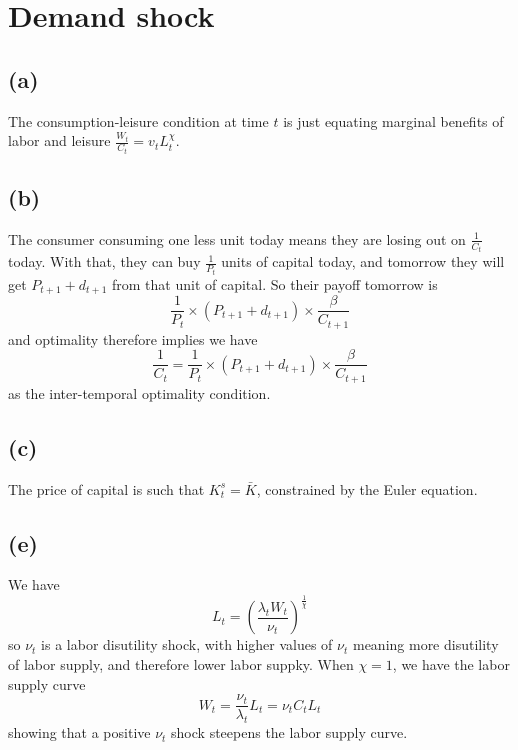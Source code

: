 \documentclass[12pt]{article}
\begin{document}
    \section{Demand shock}
    
    \subsection*{(a)}
    
    The consumption-leisure condition at time $t$ is just equating marginal benefits of labor and leisure $\frac{W_t}{C_t} = v_t L_t^\chi$.
    
    \subsection*{(b)}
    
    The consumer consuming one less unit today means they are losing out on $\frac{1}{C_t}$ today. 
    With that, they can buy $\frac{1}{P_t}$ units of capital today, and tomorrow they will get $P_{t+1} + d_{t+1}$ from that unit of capital. 
    So their payoff tomorrow is 
    \[
    \frac{1}{P_t} \times (P_{t+1} + d_{t+1}) \times \frac{\beta}{C_{t+1}}
    \]
    and optimality therefore implies we have
    \[
    \frac{1}{C_t} = \frac{1}{P_t} \times (P_{t+1} + d_{t+1}) \times \frac{\beta}{C_{t+1}}
    \]
    as the inter-temporal optimality condition.
    
    \subsection*{(c)}
    
    The price of capital is such that $K_t^s = \bar{K}$, constrained by the Euler equation.
    
    \subsection*{(e)} 
    We have
        \begin{equation*}
        L_t = \left( \frac{\lambda_t W_t}{\nu_t} \right)^{\frac{1}{\chi}}
        \end{equation*}
        so $\nu_t$ is a labor disutility shock, with higher values of $\nu_t$ meaning more disutility of labor supply, and therefore lower labor suppky. 
        When $\chi = 1$, we have the labor supply curve 
        \begin{equation*}
        W_t = \frac{\nu_t}{\lambda_t} L_t = \nu_t C_t L_t  
        \end{equation*}
        showing that a positive $\nu_t$ shock steepens the labor supply curve. 
        
\end{document}
